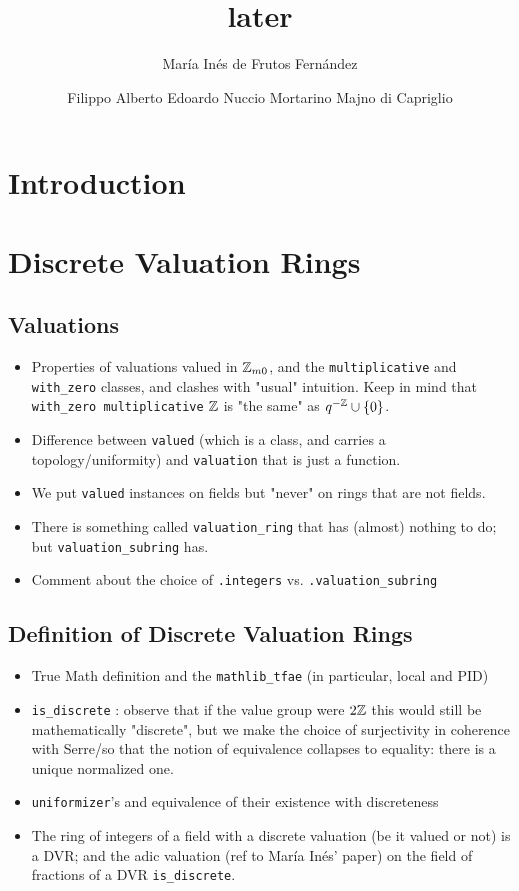 \documentclass[sigplan,10pt,anonymous,review]{acmart}\settopmatter{printfolios=true,printccs=false,printacmref=false}
\author[M.~I.~de Frutos Fernández]{María Inés de Frutos Fernández}
\author[F.~A.~E.~Nuccio]{Filippo Alberto Edoardo Nuccio Mortarino Majno di Capriglio}
\title{later}
\begin{document}
\maketitle
\section{Introduction}
\section {Discrete Valuation Rings}
\subsection{Valuations}
\begin{itemize}
\item Properties of valuations valued in $\mathbb{Z}_{m0}$, and the \texttt{multiplicative} and \texttt{with\_zero} classes, and clashes with "usual" intuition. Keep in mind that \texttt{with\_zero multiplicative} $\mathbb{Z}$ is "the same" as $q^{-\mathbb{Z}}\cup \{0\}$.
\item Difference between \texttt{valued} (which is a class, and carries a topology/uniformity) and \texttt{valuation} that is just a function.
\item We put \texttt{valued} instances on fields but "never" on rings that are not fields.
\item There is something called \texttt{valuation\_ring} that has (almost) nothing to do; but \texttt{valuation\_subring} has.
\item Comment about the choice of \texttt{.integers} vs. \texttt{.valuation\_subring}
\end{itemize}
\subsection{Definition of Discrete Valuation Rings}
\begin{itemize}
\item True Math definition and the \texttt{mathlib\_tfae} (in particular, local and PID)
\item \texttt{is\_discrete} : observe that if the value group were $2\mathbb{Z}$ this would still be mathematically "discrete", but we make the choice of surjectivity in coherence with Serre/so that the notion of equivalence collapses to equality: there is a unique normalized one.
\item \texttt{uniformizer}'s and equivalence of their existence with discreteness
\item The ring of integers of a field with a discrete valuation (be it valued or not) is a DVR; and the adic valuation (ref to María Inés' paper) on the field of fractions of a DVR \texttt{is\_discrete}.
\end{itemize}
\end{document}
